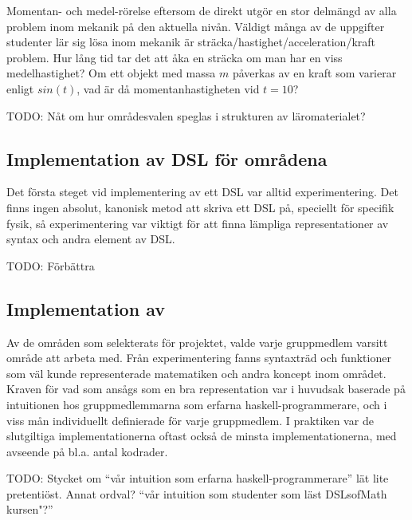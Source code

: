 \begin{binge}
\begin{draft}
  Momentan- och medel-rörelse eftersom de direkt utgör en stor delmängd
  av alla problem inom mekanik på den aktuella nivån. Väldigt många av
  de uppgifter studenter lär sig lösa inom mekanik är
  sträcka/hastighet/acceleration/kraft problem. Hur lång tid tar det att åka en
  sträcka om man har en viss medelhastighet? Om ett objekt med massa $m$
  påverkas av en kraft som varierar enligt $sin(t)$, vad är då
  momentanhastigheten vid $t=10$?
\end{draft}

TODO: Nåt om hur områdesvalen speglas i strukturen av läromaterialet?

\end{binge}

\begin{binge}
  \section{Implementation av DSL för områdena}

  \begin{draft}
    Det första steget vid implementering av ett DSL var alltid
    experimentering. Det finns ingen absolut, kanonisk metod att skriva
    ett DSL på, speciellt för specifik fysik, så experimentering var
    viktigt för att finna lämpliga representationer av syntax och andra
    element av DSL.
  \end{draft}

  TODO: Förbättra

  \subsection{Implementation av }

  \begin{draft}
    Av de områden som selekterats för projektet, valde varje gruppmedlem
    varsitt område att arbeta med. Från experimentering fanns syntaxträd
    och funktioner som väl kunde representerade matematiken och andra
    koncept inom området. Kraven för vad som ansågs som en bra
    representation var i huvudsak baserade på intuitionen hos
    gruppmedlemmarna som erfarna haskell-programmerare, och i viss mån
    individuellt definierade för varje gruppmedlem. I praktiken var de
    slutgiltiga implementationerna oftast också de minsta
    implementationerna, med avseende på bl.a. antal kodrader.

    TODO: Stycket om ``vår intuition som erfarna haskell-programmerare''
    lät lite pretentiöst. Annat ordval? ``vår intuition som studenter
    som läst DSLsofMath kursen"?''


\end{draft}
\end{binge}
